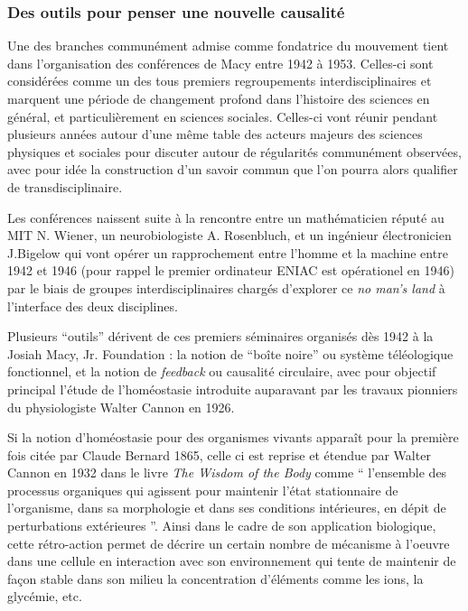 \subsubsection{Des outils pour penser une nouvelle causalité}

Une des branches communément admise comme fondatrice du mouvement tient dans l'organisation des conférences de Macy entre 1942 à 1953. Celles-ci sont considérées comme un des tous premiers regroupements interdisciplinaires et marquent une période de changement profond dans l'histoire des sciences en général, et particulièrement en sciences sociales. Celles-ci vont réunir pendant plusieurs années autour d'une même table des acteurs majeurs des sciences physiques et sociales pour discuter autour de régularités communément observées, avec pour idée la construction d'un savoir commun que l'on pourra alors qualifier de transdisciplinaire.

Les conférences naissent suite à la rencontre entre un mathématicien réputé au MIT N. Wiener, un neurobiologiste A. Rosenbluch, et un ingénieur électronicien J.Bigelow qui vont opérer un rapprochement entre l'homme et la machine entre 1942 et 1946 (pour rappel le premier ordinateur ENIAC est opérationel en 1946) par le biais de groupes interdisciplinaires chargés d'explorer ce \textit{no man's land} à l'interface des deux disciplines.

Plusieurs \enquote{outils} dérivent de ces premiers séminaires organisés dès 1942 à la Josiah Macy, Jr. Foundation : la notion de \enquote{boîte noire} ou système téléologique fonctionnel, et la notion de \textit{feedback} ou causalité circulaire, avec pour objectif principal l'étude de l'homéostasie introduite auparavant par les travaux pionniers du physiologiste Walter Cannon en 1926.

Si la notion d'homéostasie pour des organismes vivants apparaît pour la première fois citée par Claude Bernard 1865, celle ci est reprise et étendue par Walter Cannon en 1932 dans le livre \textit{The Wisdom of the Body} \autocite{Cannon1932} comme \enquote{ l’ensemble des processus organiques qui agissent pour maintenir l’état stationnaire de l’organisme, dans sa morphologie et dans ses conditions intérieures, en dépit de perturbations extérieures }. Ainsi dans le cadre de son application biologique, cette rétro-action permet de décrire un certain nombre de mécanisme à l'oeuvre dans une cellule en interaction avec son environnement qui tente de maintenir de façon stable dans son milieu la concentration d'éléments comme les ions, la glycémie, etc.

